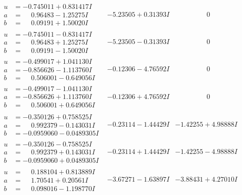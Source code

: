 \documentclass[1p]{elsarticle_modified}
\theoremstyle{definition}
\begin{document}
$$\begin{array}{c|c|c}
\begin{aligned}
u &= -0.745011 + 0.831417 I \\
a &= \phantom{-}0.96483 - 1.25275 I \\
b &= \phantom{-}0.09191 + 1.50020 I\end{aligned}
 & -5.23505 + 0.31393 I & \phantom{-0.000000 } 0 \\ \hline\begin{aligned}
u &= -0.745011 - 0.831417 I \\
a &= \phantom{-}0.96483 + 1.25275 I \\
b &= \phantom{-}0.09191 - 1.50020 I\end{aligned}
 & -5.23505 - 0.31393 I & \phantom{-0.000000 } 0 \\ \hline\begin{aligned}
u &= -0.499017 + 1.041130 I \\
a &= -0.856626 - 1.113760 I \\
b &= \phantom{-}0.506001 - 0.649056 I\end{aligned}
 & -0.12306 - 4.76592 I & \phantom{-0.000000 } 0 \\ \hline\begin{aligned}
u &= -0.499017 - 1.041130 I \\
a &= -0.856626 + 1.113760 I \\
b &= \phantom{-}0.506001 + 0.649056 I\end{aligned}
 & -0.12306 + 4.76592 I & \phantom{-0.000000 } 0 \\ \hline\begin{aligned}
u &= -0.350126 + 0.758525 I \\
a &= \phantom{-}0.992379 - 0.143031 I \\
b &= -0.0959060 - 0.0489305 I\end{aligned}
 & -0.23114 - 1.44429 I & -1.42255 + 4.98888 I \\ \hline\begin{aligned}
u &= -0.350126 - 0.758525 I \\
a &= \phantom{-}0.992379 + 0.143031 I \\
b &= -0.0959060 + 0.0489305 I\end{aligned}
 & -0.23114 + 1.44429 I & -1.42255 - 4.98888 I \\ \hline\begin{aligned}
u &= \phantom{-}0.188104 + 0.813889 I \\
a &= \phantom{-}1.70541 + 0.20561 I \\
b &= \phantom{-}0.098016 - 1.198770 I\end{aligned}
 & -3.67271 - 1.63897 I & -3.88431 + 4.27010 I \\ \hline\begin{aligned}

\end{aligned}
\end{array}$$
\end{document}
